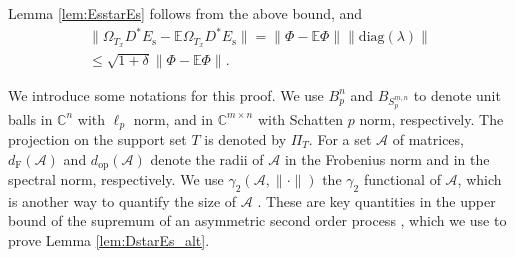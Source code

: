 \documentclass[11pt,journal]{IEEEtran}
\newcommand{\calA}{\mathcal{A}}
\newcommand{\bbC}{\mathbb{C}}
\newcommand{\bbE}{\mathbb{E}}
\newcommand{\rms}{\mathrm{s}}
\newcommand{\norm}[1]{\|{#1}\|}
\newcommand{\diag}{\mathrm{diag}}
\begin{document}
\begin{IEEEproof}
Lemma \ref{lem:EsstarEs} follows from the above bound, and
\begin{align*}
\norm{\Omega_{T_x}D^*E_\rms-\bbE \Omega_{T_x}D^*E_\rms} = \norm{\Phi-\bbE \Phi}\norm{\diag(\lambda)} \\
\leq \sqrt{1+\delta} \norm{\Phi-\bbE \Phi}.
\end{align*}

\end{IEEEproof}




\begin{IEEEproof}
We introduce some notations for this proof. We use $B_p^n$ and $B_{S_p^{m,n}}$ to denote unit balls in $\bbC^n$ with $\ell_p$ norm, and in $\bbC^{m\times n}$ with Schatten $p$ norm, respectively. The projection on the support set $T$ is denoted by $\Pi_T$. For a set $\calA$ of matrices, $d_\mathrm{F}(\calA)$ and $d_\mathrm{op}(\calA)$ denote the radii of $\calA$ in the Frobenius norm and in the spectral norm, respectively. We use $\gamma_2(\calA, \norm{\cdot})$ the $\gamma_2$ functional of $\calA$, which is another way to quantify the size of $\calA$ \cite[Section 2.2]{Lee2015b}. These are key quantities in the upper bound of the supremum of an asymmetric second order process \cite[Theorem 2.3]{Lee2015b}, which we use to prove Lemma \ref{lem:DstarEs_alt}.


\end{IEEEproof}
\end{document}
